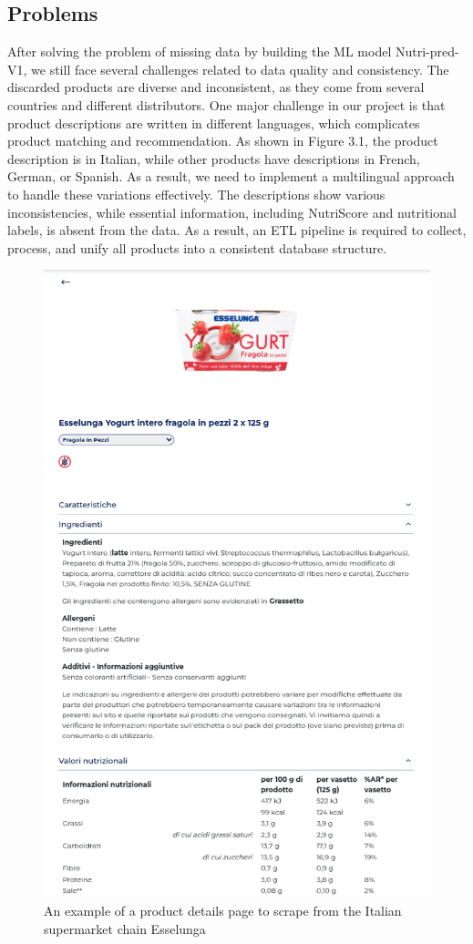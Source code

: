 \subsection{Problems} 
After solving the problem of missing data by building the ML model Nutri-pred-V1, we still face several challenges related to data quality and consistency.
The discarded products are diverse and inconsistent, as they come from
several countries and different distributors.
One major challenge in our project is that product descriptions are
written in different languages, which complicates product matching and
recommendation. As shown in Figure 3.1, the product description is in
Italian, while other products have descriptions in French, German, or
Spanish. As a result, we need to implement a multilingual approach
to handle these variations effectively. The descriptions show various
inconsistencies, while essential information, including NutriScore and
nutritional labels, is absent from the data.
As a result, an ETL pipeline is required to collect, process, and unify all
products into a consistent database structure.
\begin{figure}[H]
    \centering
    \includegraphics[scale=0.45]{images/product_example.png}
    \caption{An example of a product details page to scrape from the Italian supermarket chain Esselunga} 
    \label{fig:scraped_data}
\end{figure}
